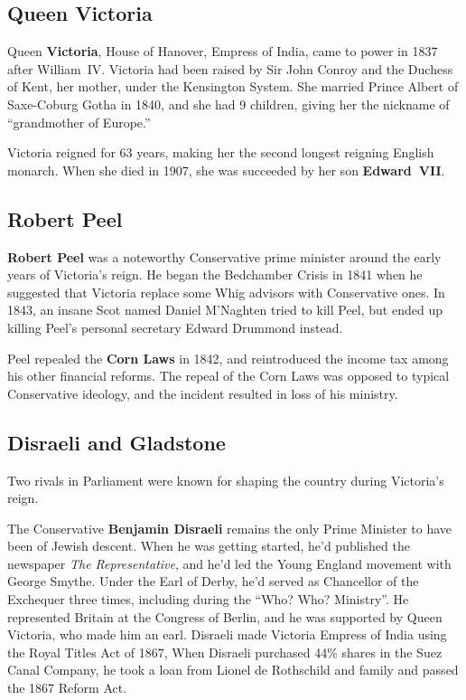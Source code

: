 \subsection*{Queen Victoria}

Queen \textbf{Victoria}, House of Hanover, Empress of India, came to power in 1837 after William~IV\@.
Victoria had been raised by Sir John Conroy and the Duchess of Kent, her mother, under the Kensington System.
She married Prince Albert of Saxe-Coburg Gotha in 1840, and she had 9 children,
giving her the nickname of ``grandmother of Europe.''

Victoria reigned for 63 years, making her the second longest reigning English monarch.
When she died in 1907, she was succeeded by her son \textbf{Edward~VII}.

\subsection*{Robert Peel}

\textbf{Robert Peel} was a noteworthy Conservative prime minister around the early years of Victoria's reign.
He began the Bedchamber Crisis in 1841 when he suggested that Victoria replace some Whig advisors with Conservative ones.
In 1843, an insane Scot named Daniel M'Naghten tried to kill Peel,
but ended up killing Peel's personal secretary Edward Drummond instead.

Peel repealed the \textbf{Corn Laws} in 1842,
and reintroduced the income tax among his other financial reforms.
The repeal of the Corn Laws was opposed to typical Conservative ideology,
and the incident resulted in loss of his ministry.

\subsection*{Disraeli and Gladstone}

Two rivals in Parliament were known for shaping the country during Victoria's reign.

The Conservative \textbf{Benjamin Disraeli} remains the only Prime Minister to have been of Jewish descent.
When he was getting started, he'd published the newspaper \textit{The Representative},
and he'd led the Young England movement with George Smythe.
Under the Earl of Derby, he'd served as Chancellor of the Exchequer three times,
including during the ``Who? Who? Ministry''.
He represented Britain at the Congress of Berlin, and he was supported by Queen Victoria, who made him an earl.
Disraeli made Victoria Empress of India using the Royal Titles Act of 1867,
When Disraeli purchased 44\% shares in the Suez Canal Company,
he took a loan from Lionel de Rothschild and family and passed the 1867 Reform Act.

